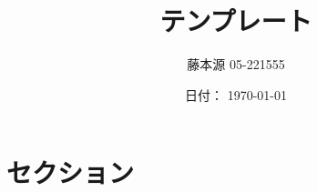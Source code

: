 \documentclass{ltjsarticle}
\title{テンプレート}
\author{藤本源 05-221555}
\date{日付： \today}
\begin{document}
\scrollmode

\maketitle

\section{セクション}


\batchmode
\end{document}
